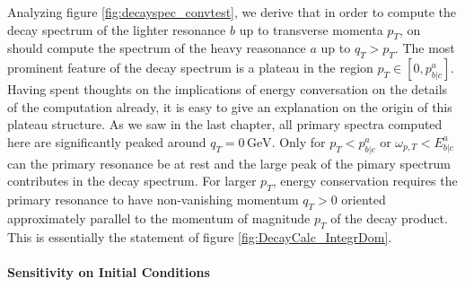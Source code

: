 {\begin{minipage}{\linewidth}
{\begin{minipage}{0.45\linewidth}
            \end{minipage}
        }
        \label{fig:decayspec_convtest}
    \end{minipage}
}
Analyzing figure \ref{fig:decayspec_convtest}, we derive that in order to compute the decay spectrum of the lighter resonance $b$ up to transverse momenta $p_T$, on should compute the spectrum of the heavy reasonance $a$ up to ${q_T>p_T}$. The most prominent feature of the decay spectrum is a plateau in the region ${p_T\in[0,p^a_{b\vert c}]}$. Having spent thoughts on the implications of energy conversation on the details of the computation already, it is easy to give an explanation on the origin of this plateau structure. As we saw in the last chapter, all primary spectra computed here are significantly peaked around ${q_T=0\,\text{GeV}}$. Only for ${p_T< p^a_{b\vert c}}$ or ${\omega_{p,T}<E^a_{b\vert c}}$ can the primary resonance be at rest and the large peak of the pimary spectrum contributes in the decay spectrum. For larger $p_T$, energy conservation requires the primary resonance to have non-vanishing momentum ${q_T>0}$ oriented approximately parallel to the momentum of magnitude ${p_T}$ of the decay product. This is essentially the statement of figure \ref{fig:DecayCalc_IntegrDom}.

\paragraph{Sensitivity on Initial Conditions}

